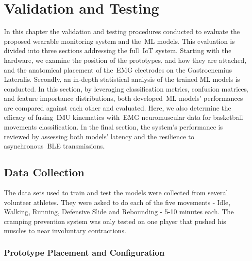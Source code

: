 


\chapter{Validation and Testing}
\label{cha:validationTesting}

In this chapter the validation and testing procedures conducted to evaluate the proposed wearable monitoring system and the~\gls{ML} models. This evaluation is divided into three sections addressing the full~\gls{IoT} system.
Starting with the hardware, we examine the position of the prototypes, and how they are attached, and the anatomical placement of the~\gls{EMG} electrodes on the Gastrocnemius Lateralis. Secondly, an in-depth statistical analysis of the trained 
\gls{ML} models is conducted. In this section, by leveraging classification metrics, confusion matrices, and feature importance distributions, both developed~\gls{ML} models' performances are compared against each other and evaluated. Here, 
we also determine the efficacy of fusing~\gls{IMU} kinematics with~\gls{EMG} neuromuscular data for basketball movements classification. In the final section, the system's performance is reviewed by assessing both models' latency and the resilience 
to asynchronous~\gls{BLE} transmissions.


\section{Data Collection}
\label{sec:data_collection}

The data sets used to train and test the models were collected from several volunteer athletes. They were asked to do each of the five movements - Idle, Walking, Running, Defensive Slide and Rebounding - 5-10 minutes
each. The cramping prevention system was only tested on one player that pushed his muscles to near involuntary contractions.


\subsection{Prototype Placement and Configuration}
\label{ssec:prototype_placement}

